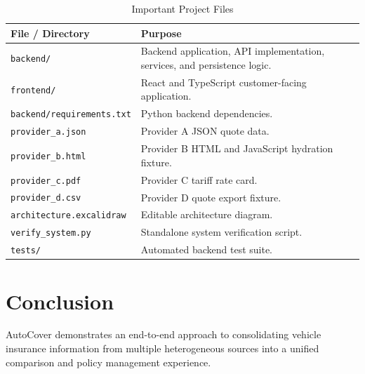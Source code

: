 \documentclass[11pt,a4paper]{article}
\begin{document}
\begin{table}[H]
\centering
\caption{Important Project Files}
\begin{tabularx}{\textwidth}{L{4.3cm}Y}
\toprule
\textbf{File / Directory} & \textbf{Purpose} \\
\midrule

\texttt{backend/} &
Backend application, API implementation, services,
and persistence logic. \\

\texttt{frontend/} &
React and TypeScript customer-facing application. \\

\texttt{backend/requirements.txt} &
Python backend dependencies. \\

\texttt{provider\_a.json} &
Provider A JSON quote data. \\

\texttt{provider\_b.html} &
Provider B HTML and JavaScript hydration fixture. \\

\texttt{provider\_c.pdf} &
Provider C tariff rate card. \\

\texttt{provider\_d.csv} &
Provider D quote export fixture. \\

\texttt{architecture.excalidraw} &
Editable architecture diagram. \\

\texttt{verify\_system.py} &
Standalone system verification script. \\

\texttt{tests/} &
Automated backend test suite. \\

\bottomrule
\end{tabularx}
\end{table}


\section{Conclusion}

AutoCover demonstrates an end-to-end approach to consolidating
vehicle insurance information from multiple heterogeneous sources
into a unified comparison and policy management experience.
\end{document}
